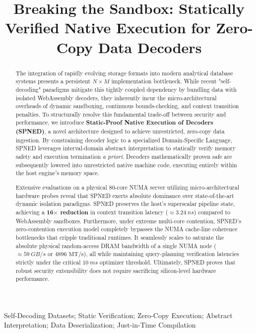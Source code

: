 \documentclass[onecolumn]{IEEEtran}
\numberwithin{equation}{section}
\theoremstyle{definition}
\theoremstyle{remark}
\begin{document}
\title{Breaking the Sandbox: Statically Verified Native Execution for Zero-Copy Data Decoders}
\author{}

\maketitle

\begin{abstract}
The integration of rapidly evolving storage formats into modern analytical database systems presents a persistent $N \times M$ implementation bottleneck. While recent "self-decoding" paradigms mitigate this tightly coupled dependency by bundling data with isolated WebAssembly decoders, they inherently incur the micro-architectural overheads of dynamic sandboxing, continuous bounds-checking, and context transition penalties. To structurally resolve this fundamental trade-off between security and performance, we introduce \textbf{Static-Proof Native Execution of Decoders (SPNED)}, a novel architecture designed to achieve unrestricted, zero-copy data ingestion. By constraining decoder logic to a specialized Domain-Specific Language, SPNED leverages interval-domain abstract interpretation to statically verify memory safety and execution termination \textit{a priori}. Decoders mathematically proven safe are subsequently lowered into unrestricted native machine code, executing entirely within the host engine's memory space.

Extensive evaluations on a physical 80-core NUMA server utilizing micro-architectural hardware probes reveal that SPNED exerts absolute dominance over state-of-the-art dynamic isolation paradigms. SPNED preserves the host's superscalar pipeline state, achieving a \textbf{16$\times$ reduction} in context transition latency ($\approx \SI{3.24}{ns}$) compared to WebAssembly sandboxes. Furthermore, under extreme multi-core contention, SPNED's zero-contention execution model completely bypasses the NUMA cache-line coherence bottlenecks that cripple traditional runtimes. It seamlessly scales to saturate the absolute physical random-access DRAM bandwidth of a single NUMA node ($\approx \SI{59}{GB/s}$ or $4896\text{ MT/s}$), all while maintaining query-planning verification latencies strictly under the critical $\SI{10}{ms}$ optimizer threshold. Ultimately, SPNED proves that robust security extensibility does not require sacrificing silicon-level hardware performance.
\end{abstract}

\begin{IEEEkeywords}
Self-Decoding Datasets; Static Verification; Zero-Copy Execution; Abstract Interpretation; Data Deserialization; Just-in-Time Compilation
\end{IEEEkeywords}
\end{document}
